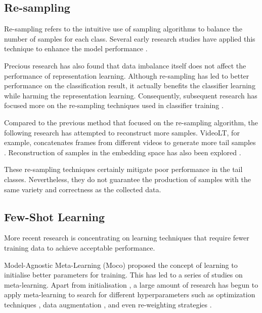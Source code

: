 \subsection{Re-sampling}
Re-sampling refers to the intuitive use of sampling algorithms to balance the number of samples for each class. Several early research studies have applied this technique to enhance the model performance \parencite{shen2016relay, 5128907, mahajan2018exploring}.

Precious research has also found that data imbalance itself does not affect the performance of representation learning. Although re-sampling has led to better performance on the classification result, it actually benefits the classifier learning while harming the representation learning. Consequently, subsequent research has focused more on the re-sampling techniques used in classifier training \parencite{zhou2020bbn, kang2019decoupling}.

Compared to the previous method that focused on the re-sampling algorithm, the following research has attempted to reconstruct more samples. VideoLT, for example, concatenates frames from different videos to generate more tail samples \parencite{zhang2021videolt}. Reconstruction of samples in the embedding space has also been explored \parencite{liu2022long, perrett2023use}.

These re-sampling techniques certainly mitigate poor performance in the tail classes. Nevertheless, they do not guarantee the production of samples with the same variety and correctness as the collected data.

\subsection{Few-Shot Learning}
More recent research is concentrating on learning techniques that require fewer training data to achieve acceptable performance.

Model-Agnostic Meta-Learning (Moco) \parencite{finn2017model} proposed the concept of learning to initialise better parameters for training. This has led to a series of studies on meta-learning. Apart from initialisation \parencite{nichol2018first, 2018Reptile}, a large amount of research has begun to apply meta-learning to search for different hyperparameters such as optimization techniques \parencite{andrychowicz2016learning}, data augmentation \parencite{li2020dada, galashov2022data, cubuk2018autoaugment}, and even re-weighting strategies \parencite{shu2019meta}.

